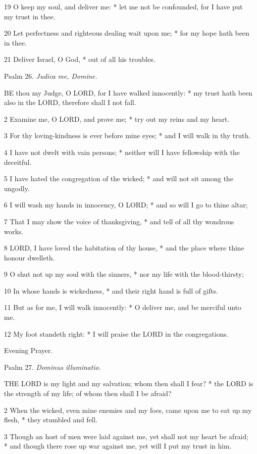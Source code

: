 19 O keep my soul, and deliver me: * let me not be
confounded, for I have put my trust in thee.

20 Let perfectness and righteous dealing wait upon
me; * for my hope hath been in thee.

21 Deliver Israel, O God, * out of all his troubles.

Psalm
26. \emph{Judica me, Domine.}

BE
thou my Judge, O LORD, for I have walked innocently:
* my trust hath been also in the LORD, therefore
shall I not fall.

2 Examine me, O LORD, and prove
me; * try out my reins and my heart.

3 For thy loving-kindness is ever before mine eyes;
* and I will walk in thy truth.

4 I have not dwelt with vain persons; * neither will
I have fellowship with the deceitful.

5 I have hated the congregation of the wicked; * and
will not sit among the ungodly.

6 I will wash my hands in innocency, O LORD;
* and so will I go to thine altar;

7 That I may show the voice of thanksgiving, * and
tell of all thy wondrous works.

8 LORD, I have loved the habitation
of thy house, * and the place where thine honour dwelleth.

9 O shut not up my soul with the sinners, * nor my
life with the blood-thirsty;

10 In whose hands is wickedness, * and their right
hand is full of gifts.

11 But as for me, I will walk innocently: * O deliver
me, and be merciful unto me.

12 My foot standeth right: * I will praise the LORD
in the congregations.

Evening
Prayer.

Psalm
27. \emph{Dominus illuminatio.}

THE
LORD is my light and my salvation; whom then shall
I fear? * the LORD is the strength of my life;
of whom then shall I be afraid?

2 When the wicked, even mine enemies and my foes, came
upon me to eat up my flesh, * they stumbled and fell.

3 Though an host of men were laid against me, yet shall
not my heart be afraid; * and though there rose up war against me, yet
will I put my trust in him.

